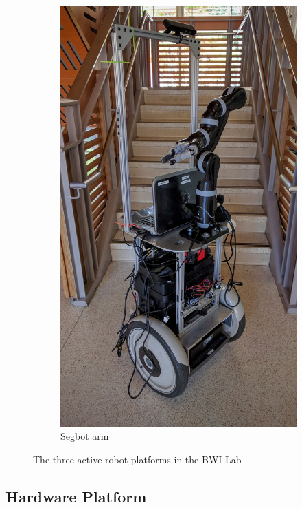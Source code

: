 \documentclass[
  oneside,
  11pt, a4paper,
  footinclude=true,
  headinclude=true,
  cleardoublepage=empty
]{article}
\begin{document}
\begin{figure}[!tbp]
\begin{subfigure}[b]{0.3\textwidth}
    \includegraphics[width=\textwidth]{bwi_segbotarm}
    \caption{Segbot arm}
    \label{fig:segbotarm}
  \end{subfigure}
  \caption{The three active robot platforms in the BWI Lab}
  \label{fig:robots}
\end{figure}

\subsection{Hardware Platform}
\end{document}
